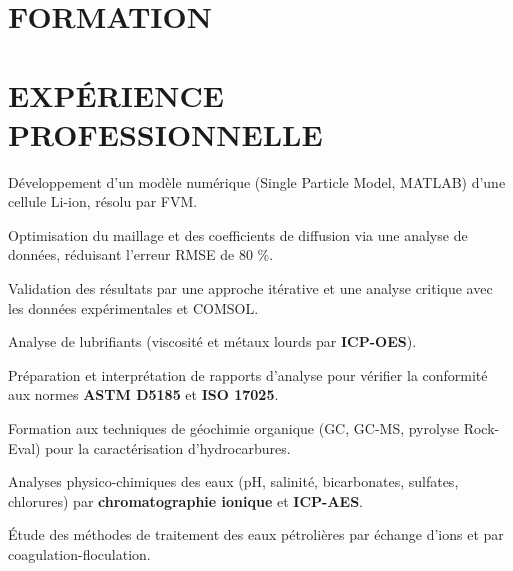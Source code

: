 \documentclass[10pt]{article}
\begin{document}

\section{FORMATION}

\section{EXPÉRIENCE PROFESSIONNELLE}
\begin{bul}
\item Développement d'un modèle numérique (Single Particle Model, MATLAB) d'une cellule Li-ion, résolu par FVM.
\item Optimisation du maillage et des coefficients de diffusion via une analyse de données, réduisant l'erreur RMSE de 80 \%.
\item Validation des résultats par une approche itérative et une analyse critique avec les données expérimentales et COMSOL.
\end{bul}
\begin{bul}
\item Analyse de lubrifiants (viscosité et métaux lourds par \textbf{ICP-OES}).
\item Préparation et interprétation de rapports d'analyse pour vérifier la conformité aux normes \textbf{ASTM D5185} et \textbf{ISO 17025}.
\end{bul}
\begin{bul}
\item Formation aux techniques de géochimie organique (GC, GC-MS, pyrolyse Rock-Eval) pour la caractérisation d'hydrocarbures.
\item Analyses physico-chimiques des eaux (pH, salinité, bicarbonates, sulfates, chlorures) par \textbf{chromatographie ionique} et \textbf{ICP-AES}.
\item Étude des méthodes de traitement des eaux pétrolières par échange d'ions et par coagulation-floculation.
\end{bul}
\end{document}
